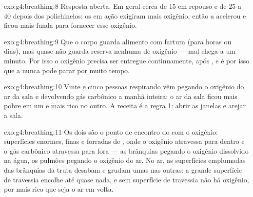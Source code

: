 \begin{solution}{exo:g4:breathing:8}
Resposta aberta. Em geral cerca de $15$ em repouso e de $25$ a $40$
depois dos polichinelos: os  em ação exigiram mais oxigênio,
então a  acelerou e ficou mais funda para fornecer esse
oxigênio.
\end{solution}

\begin{solution}{exo:g4:breathing:9}
Que o corpo guarda alimento com fartura (para horas ou dias), mas
quase não guarda reserva nenhuma de oxigênio --- mal chega a um
minuto. Por isso o oxigênio precisa ser entregue continuamente,
 após , e é por isso que a  nunca pode
parar por muito tempo.
\end{solution}

\begin{solution}{exo:g4:breathing:10}
Vinte e cinco pessoas respirando vêm pegando o oxigênio do ar da
sala e devolvendo gás carbônico a manhã inteira: o ar da sala ficou
mais pobre em um e mais rico no outro. A receita é a regra 1: abrir
as janelas e arejar a sala.
\end{solution}

\begin{solution}{exo:g4:breathing:11}
Os dois são o ponto de encontro do  com o oxigênio:
superfícies enormes, finas e forradas de , onde o oxigênio
atravessa para dentro e o gás carbônico atravessa para fora --- as
brânquias pegando o oxigênio dissolvido na água, os pulmões pegando
o oxigênio do ar. No ar, as superfícies emplumadas das brânquias da
truta desabam e grudam umas nas outras: a grande superfície de
travessia encolhe até quase nada, e sem superfície de travessia não
há oxigênio, por mais rico que seja o ar em volta.
\end{solution}
